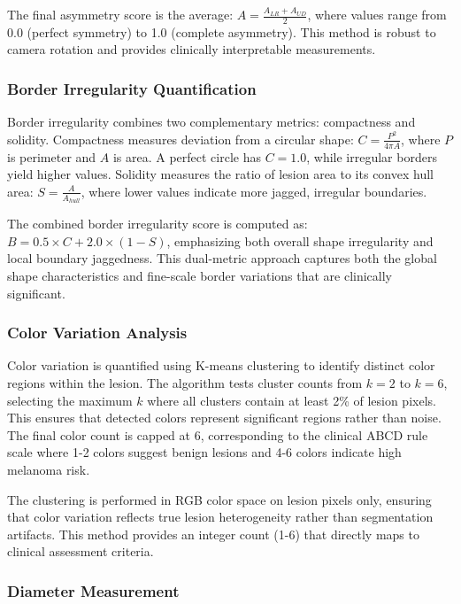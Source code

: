 \documentclass[conference]{IEEEtran}
\begin{document}
The final asymmetry score is the average: $A = \frac{A_{LR} + A_{UD}}{2}$, where values range from 0.0 (perfect symmetry) to 1.0 (complete asymmetry). This method is robust to camera rotation and provides clinically interpretable measurements.

\subsubsection{Border Irregularity Quantification}

Border irregularity combines two complementary metrics: compactness and solidity. Compactness measures deviation from a circular shape: $C = \frac{P^2}{4\pi A}$, where $P$ is perimeter and $A$ is area. A perfect circle has $C = 1.0$, while irregular borders yield higher values. Solidity measures the ratio of lesion area to its convex hull area: $S = \frac{A}{A_{hull}}$, where lower values indicate more jagged, irregular boundaries.

The combined border irregularity score is computed as: $B = 0.5 \times C + 2.0 \times (1 - S)$, emphasizing both overall shape irregularity and local boundary jaggedness. This dual-metric approach captures both the global shape characteristics and fine-scale border variations that are clinically significant.

\subsubsection{Color Variation Analysis}

Color variation is quantified using K-means clustering to identify distinct color regions within the lesion. The algorithm tests cluster counts from $k=2$ to $k=6$, selecting the maximum $k$ where all clusters contain at least 2\% of lesion pixels. This ensures that detected colors represent significant regions rather than noise. The final color count is capped at 6, corresponding to the clinical ABCD rule scale where 1-2 colors suggest benign lesions and 4-6 colors indicate high melanoma risk.

The clustering is performed in RGB color space on lesion pixels only, ensuring that color variation reflects true lesion heterogeneity rather than segmentation artifacts. This method provides an integer count (1-6) that directly maps to clinical assessment criteria.

\subsubsection{Diameter Measurement}
\end{document}
